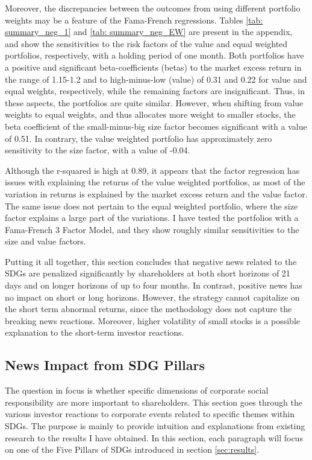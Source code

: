 Moreover, the discrepancies between the outcomes from using different portfolio weights may be a feature of the Fama-French regressions. Tables \ref{tab: summary_neg_1} and \ref{tab: summary_neg_EW} are present in the appendix, and show the sensitivities to the risk factors of the value and equal weighted portfolios, respectively, with a holding period of one month. Both portfolios have a positive and significant beta-coefficients (betas) to the market excess return in the range of 1.15-1.2 and to high-minus-low (value) of 0.31 and 0.22 for value and equal weights, respectively, while the remaining factors are insignificant. Thus, in these aspects, the portfolios are quite similar. However, when shifting from value weights to equal weights, and thus allocates more weight to smaller stocks, the beta coefficient of the small-minus-big size factor becomes significant with a value of 0.51. In contrary, the value weighted portfolio has approximately zero sensitivity to the size factor, with a value of -0.04. 

Although the r-squared is high at 0.89, it appears that the factor regression has issues with explaining the returns of the value weighted portfolios, as most of the variation in returns is explained by the market excess return and the value factor. The same issue does not pertain to the equal weighted portfolio, where the size factor explains a large part of the variations. I have tested the portfolios with a Fama-French 3 Factor Model, and they show roughly similar sensitivities to the size and value factors.  



Putting it all together, this section concludes that negative news related to the SDGs are penalized significantly by shareholders at both short horizons of 21 days and on longer horizons of up to four months. In contrast, positive news has no impact on short or long horizons. However, the strategy cannot capitalize on the short term abnormal returns, since the methodology does not capture the breaking news reactions. Moreover,
higher volatility of small stocks is a possible explanation to the short-term investor reactions.

\subsection{News Impact from SDG Pillars} \label{sec: short_term_analysis_SDG}

The question in focus is whether specific dimensions of corporate social responsibility are more important to shareholders. This section goes through the various investor reactions to corporate events related to specific themes within SDGs. The purpose is mainly to provide intuition and explanations from existing research to the results I have obtained. In this section, each paragraph will focus on one of the Five Pillars of SDGs introduced in section \ref{sec:results}.    

